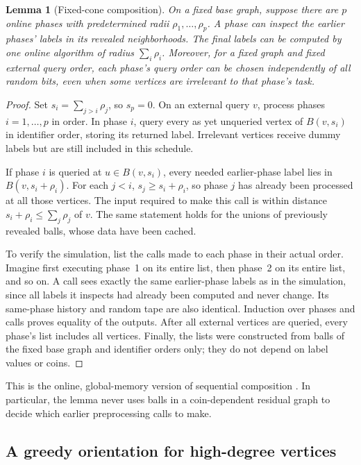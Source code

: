 \documentclass[11pt]{article}
\newtheorem{lemma}[theorem]{Lemma}
\theoremstyle{definition}
\begin{document}
\begin{lemma}[Fixed-cone composition]\label{lem:composition}
On a fixed base graph, suppose there are $p$ online phases with predetermined
radii $\rho_1,\ldots,\rho_p$. A phase can inspect the earlier phases' labels
in its revealed neighborhoods. The final labels can be computed by one
online algorithm of radius $\sum_i\rho_i$. Moreover, for a fixed graph and
fixed external query order, each phase's query order can be chosen
independently of all random bits, even when some vertices are irrelevant
to that phase's task.
\end{lemma}
\begin{proof}
Set $s_i=\sum_{j>i}\rho_j$, so $s_p=0$. On an external query $v$, process
phases $i=1,\ldots,p$ in order. In phase $i$, query every as yet unqueried
vertex of $B(v,s_i)$ in identifier order, storing its returned label.
Irrelevant vertices receive dummy labels but are still included in this
schedule.

If phase $i$ is queried at $u\in B(v,s_i)$, every needed earlier-phase
label lies in $B(v,s_i+\rho_i)$. For each $j<i$,
$s_j\ge s_i+\rho_i$, so phase $j$ has already been processed at all those
vertices. The input required to make this call is within distance
$s_i+\rho_i\le\sum_j\rho_j$ of $v$. The same statement holds for the
unions of previously revealed balls, whose data have been cached.

To verify the simulation, list the calls made to each phase in their actual
order. Imagine first executing phase~1 on its entire list, then phase~2 on
its entire list, and so on. A call sees exactly the same earlier-phase
labels as in the simulation, since all labels it inspects had already been
computed and never change. Its same-phase history and random tape are also
identical. Induction over phases and calls proves equality of the outputs.
After all external vertices are queried, every phase's list includes all
vertices. Finally, the lists were constructed from balls of the fixed base
graph and identifier orders only; they do not depend on label values or
coins.
\end{proof}

This is the online, global-memory version of sequential composition
\cite{GKM,simple}. In particular, the lemma never uses balls in a
coin-dependent residual graph to decide which earlier preprocessing calls
to make.

\subsection{A greedy orientation for high-degree vertices}
\end{document}

